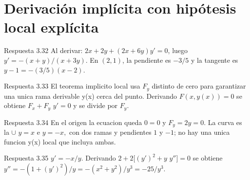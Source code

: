 \documentclass[10pt,a4paper,oneside,openany]{book}
\begin{document}
\section{Derivación implícita con hipótesis local explícita}
\begin{PSevenAnswerFixed}{Respuesta 3.32}
Al derivar: \(2x+2y+(2x+6y)y'=0\), luego \(y'=-(x+y)/(x+3y)\). En \((2,1)\), la pendiente es \(-3/5\) y la tangente es \(y-1=-(3/5)(x-2)\).
\end{PSevenAnswerFixed}
\begin{PSevenAnswerFixed}{Respuesta 3.33}
El teorema implicito local usa \(F_y\) distinto de cero para garantizar una unica rama derivable y(x) cerca del punto. Derivando \(F(x,y(x))=0\) se obtiene \(F_x+F_y\) \(y'=0\) y se divide por \(F_y\).
\end{PSevenAnswerFixed}
\begin{PSevenAnswerFixed}{Respuesta 3.34}
En el origen la ecuacion queda \(0=0\) y \(F_y=2y=0\). La curva es la \(\cup \) \(y=x\) e \(y=-x,\) con dos ramas y pendientes \(1\) y \(-1\); no hay una unica funcion y(x) local que incluya ambas.
\end{PSevenAnswerFixed}
\begin{PSevenAnswerFixed}{Respuesta 3.35}
\(y'=-x/y\). Derivando \(2+2[(y')^{2}+y\) \(y'']=0\) se obtiene \(y''=-(1+(y')^{2})/y=-(x^{2}+y^{2})/y^{3}=-25/y^{3}\).
\end{PSevenAnswerFixed}
\end{document}
